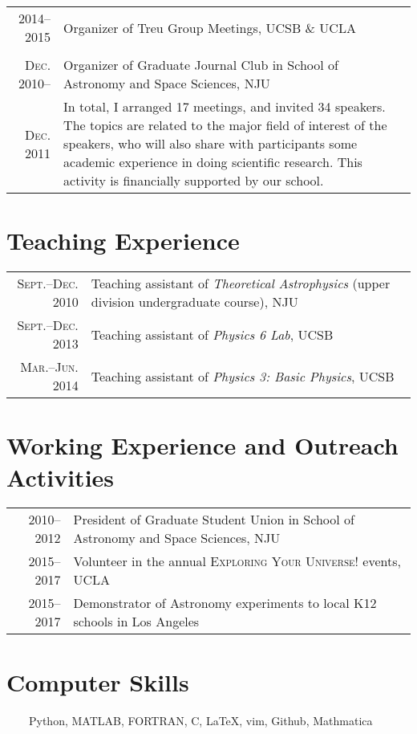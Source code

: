 \documentclass[letterpaper,11pt]{article}
\newcommand{\narrow}{-1.8ex}
\begin{document}
\begin{tabular}{r|p{5.6in}}
\textsc{2014--2015}  & Organizer of Treu Group Meetings, UCSB \& UCLA \\
\multicolumn{2}{c}{} \\[\narrow]

\textsc{Dec. 2010}--  & Organizer of Graduate Journal Club in School of Astronomy and Space Sciences, NJU \\
\textsc{Dec. 2011}    & \small{In total, I arranged 17 meetings, and invited 34 speakers.
        The topics are related to the major field of interest of the speakers, who will also share with
        participants some academic experience in doing scientific research. This activity is financially
        supported by our school.}  \\
\end{tabular}

\section{Teaching Experience}
\begin{tabular}{rp{5.6in}}
\textsc{\small Sept.--Dec. 2010}  & Teaching assistant of \textit{Theoretical Astrophysics} (upper division undergraduate course), NJU \\
\textsc{\small Sept.--Dec. 2013}  & Teaching assistant of \textit{Physics 6 Lab}, UCSB   \\
\textsc{\small Mar.--Jun. 2014}  & Teaching assistant of \textit{Physics 3: Basic Physics}, UCSB
\end{tabular}

\section{Working Experience and Outreach Activities}
\begin{tabular}{rp{5.6in}}
\textsc{2010--2012}  & President of Graduate Student Union in School of Astronomy and Space Sciences, NJU \\
\textsc{2015--2017}  & Volunteer in the annual \textsc{Exploring Your Universe!} events, UCLA \\
\textsc{2015--2017}  & Demonstrator of Astronomy experiments to local K12 schools in Los Angeles
\end{tabular}

\section{Computer Skills}
~~~~Python, MATLAB, FORTRAN, C, \LaTeX, vim, Github, Mathmatica
\end{document}
